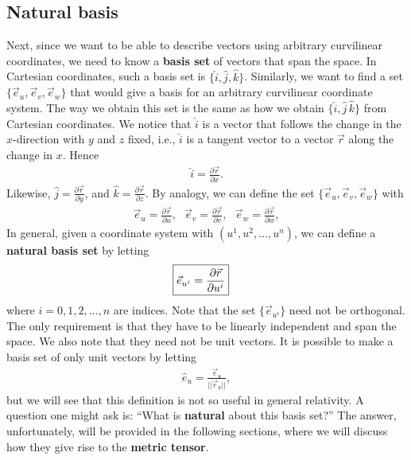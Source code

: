 \documentclass{article}
\theoremstyle{definition}
\begin{document}
\subsection{Natural basis}
Next, since we want to be able to describe vectors using arbitrary curvilinear coordinates, we need to know a \textbf{basis set} of vectors that span the space. In Cartesian coordinates, such a basis set is $\{\hat{i},\hat{j},\hat{k}\}$. Similarly, we want to find a set $\{\vec{e}_u, \vec{e}_v, \vec{e}_w\}$ that would give a basis for an arbitrary curvilinear coordinate system. The way we obtain this set is the same as how we obtain $\{\hat{i}, \hat{j}\, \hat{k}\}$ from Cartesian coordinates. We notice that $\hat{i}$ is a vector that follows the change in the $x$-direction with $y$ and $z$ fixed, i.e., $\hat{i}$ is a tangent vector to a vector $\vec{r}$ along the change in $x$. Hence
\begin{align*}
\hat{i} = \frac{\partial \vec{r}}{\partial x}.
\end{align*}
Likewise, $\hat{j} = \frac{\partial \vec{r}}{\partial y}$, and $\hat{k} = \frac{\partial \vec{r}}{\partial z}$. By analogy, we can define the set $\{ \vec{e}_u, \vec{e}_v, \vec{e}_w\}$ with
\begin{align*}
\vec{e}_u = \frac{\partial \vec{r}}{\partial u}, \text{ } \vec{e}_v = \frac{\partial \vec{r}}{\partial v}, \text{ } \vec{e}_w = \frac{\partial \vec{r}}{\partial w},
\end{align*}
In general, given a coordinate system with $(u^1,u^2,\dots,u^n)$, we can define a \textbf{natural basis set} by letting
\begin{align*}
\Aboxed{\vec{e}_{u^i} = \frac{\partial \vec{r}}{\partial u^i}}
\end{align*}
where $i = 0,1,2,\dots,n$ are indices. Note that the set $\{\vec{e}_{u^i} \}$ need not be orthogonal. The only requirement is that they have to be linearly independent and span the space. We also note that they need not be unit vectors. It is possible to make a basis set of only unit vectors by letting
\begin{align*}
\hat{e}_u = \frac{\vec{e}_u}{\vert\vert \vec{e}_u\vert\vert},
\end{align*}
but we will see that this definition is not so useful in general relativity. A question one might ask is: ``What is \textbf{natural} about this basis set?'' The answer, unfortunately, will be provided in the following sections, where we will discuss how they give rise to the \textbf{metric tensor}.\\
\end{document}
